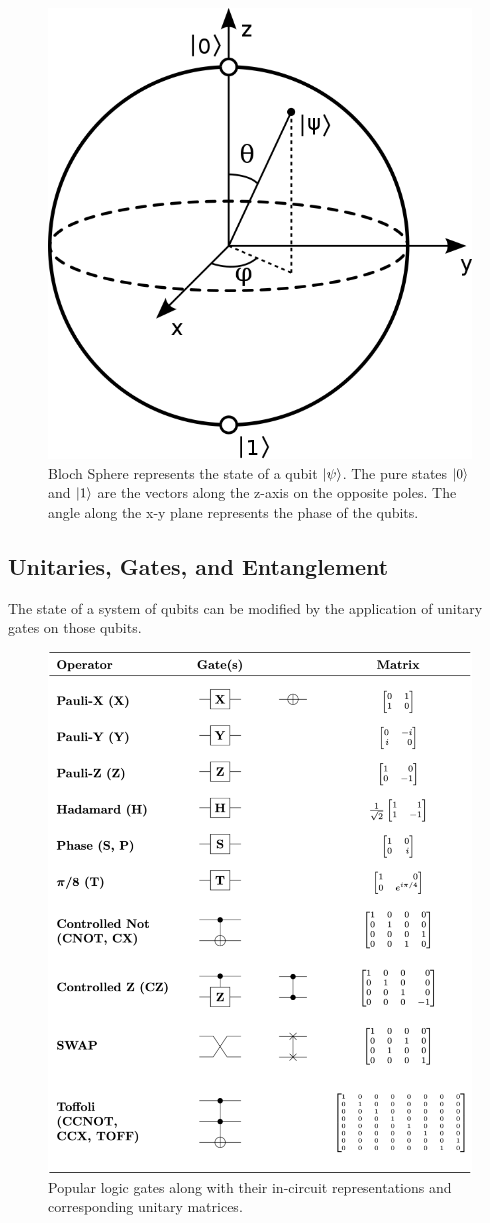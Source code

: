 \begin{figure}[ht]
    \centering
    \includegraphics[width=0.5\linewidth]{figures/quantum/bloch_sphere.png}
    \caption[Block Sphere representation of Quantum States]{Bloch Sphere represents the state of a qubit $\ket{\psi}$. The pure states $\ket{0}$ and $\ket{1}$ are the vectors along the z-axis on the opposite poles. The angle along the x-y plane represents the phase of the qubits.}
    \label{fig:bloch-sphere}
\end{figure}


\subsection{Unitaries, Gates, and Entanglement}
\label{sec:background-unitary-gate-entanglement}

The state of a system of qubits can be modified by the application of unitary gates on those qubits.

\begin{figure}[ht]
    \centering
    \includegraphics[width=0.7\linewidth]{figures/quantum/quantum_logic_gates.png}
    \caption[List of Logic Gates]{Popular logic gates along with their in-circuit representations and corresponding unitary matrices.}
    \label{fig:quantum-unitary-gates}
\end{figure}

